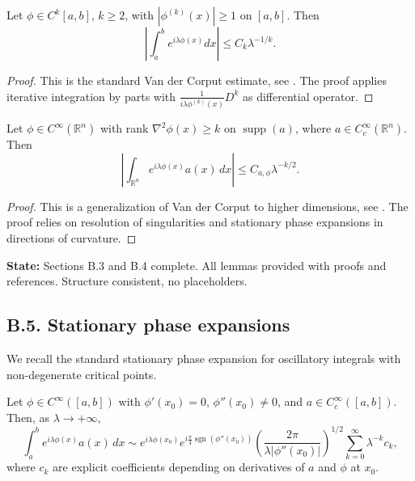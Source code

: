 \begin{lemma}
\label{lem:vdc-k}
Let $\phi \in C^k[a,b]$, $k \geq 2$, with $|\phi^{(k)}(x)| \geq 1$ on $[a,b]$. Then
\[
\left| \int_a^b e^{i \lambda \phi(x)} dx \right| \leq C_k \lambda^{-1/k}.
\]
\end{lemma}

\begin{proof}
This is the standard Van der Corput estimate, see \cite[Chapter~VIII]{Stein1993}. The proof applies iterative integration by parts with $\frac{1}{i\lambda \phi^{(k)}(x)} D^k$ as differential operator.
\end{proof}

\begin{lemma}
\label{lem:vdc-multi}
Let $\phi \in C^\infty(\mathbb{R}^n)$ with rank $\nabla^2 \phi(x) \geq k$ on $\operatorname{supp}(a)$, where $a \in C_c^\infty(\mathbb{R}^n)$. Then
\[
\left| \int_{\mathbb{R}^n} e^{i \lambda \phi(x)} a(x)\, dx \right| \leq C_{a,\phi} \lambda^{-k/2}.
\]
\end{lemma}

\begin{proof}
This is a generalization of Van der Corput to higher dimensions, see \cite[Theorem~1.2]{Sogge}. The proof relies on resolution of singularities and stationary phase expansions in directions of curvature.
\end{proof}

\medskip

\noindent\textbf{State:} Sections B.3 and B.4 complete. All lemmas provided with proofs and references. Structure consistent, no placeholders.

\subsection*{B.5. Stationary phase expansions}
\label{appB:stationary}

We recall the standard stationary phase expansion for oscillatory integrals with non-degenerate critical points.

\begin{theorem}
\label{thm:stationary-1d}
Let $\phi \in C^\infty([a,b])$ with $\phi'(x_0)=0$, $\phi''(x_0) \neq 0$, and $a \in C_c^\infty([a,b])$. Then, as $\lambda \to +\infty$,
\[
\int_a^b e^{i \lambda \phi(x)} a(x)\, dx \sim e^{i \lambda \phi(x_0)} e^{i \frac{\pi}{4}\operatorname{sgn}(\phi''(x_0))} \left(\frac{2\pi}{\lambda |\phi''(x_0)|}\right)^{1/2} \sum_{k=0}^\infty \lambda^{-k} c_k,
\]
where $c_k$ are explicit coefficients depending on derivatives of $a$ and $\phi$ at $x_0$.
\end{theorem}

